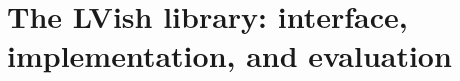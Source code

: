 \chapter{The LVish library: interface, implementation, and evaluation}\label{ch:lvish} %













